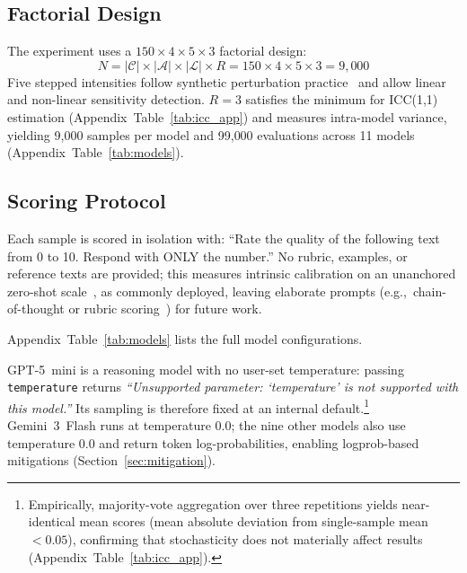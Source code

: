 \documentclass[11pt]{article}
\newcommand{\eg}{e.g.,\ }
\begin{document}
\subsection{Factorial Design}

The experiment uses a $150 \times 4 \times 5 \times 3$ factorial design:
\begin{equation}
    N = |\mathcal{C}| \times |\mathcal{A}| \times |\mathcal{L}| \times
    R = 150 \times 4 \times 5 \times 3 = 9{,}000
    \label{eq:design}
\end{equation}
Five stepped intensities follow synthetic perturbation practice~\citep{ribeiro2020beyond}
and allow linear and non-linear sensitivity detection. $R=3$ satisfies
the minimum for ICC(1,1) estimation (Appendix~Table~\ref{tab:icc_app})
and measures intra-model variance, yielding 9{,}000 samples per model
and 99{,}000 evaluations across 11 models (Appendix~Table~\ref{tab:models}).

\subsection{Scoring Protocol}

Each sample is scored in isolation with: ``Rate the quality of the
following text from 0 to 10. Respond with ONLY the number.'' No rubric,
examples, or reference texts are provided; this measures intrinsic
calibration on an unanchored zero-shot scale~\citep{zheng2023judging},
as commonly deployed, leaving elaborate prompts (\eg chain-of-thought or
rubric scoring~\citep{liu2023geval}) for future work.

Appendix~Table~\ref{tab:models} lists the full model configurations.



GPT-5~mini is a reasoning model with no user-set temperature: passing
\texttt{temperature} returns \textit{``Unsupported parameter: `temperature'
is not supported with this model.''} Its sampling is therefore fixed at
an internal default.\footnote{Empirically, majority-vote aggregation over
three repetitions yields near-identical mean scores (mean absolute
deviation from single-sample mean $<0.05$), confirming that stochasticity
does not materially affect results (Appendix~Table~\ref{tab:icc_app}).}
Gemini~3~Flash runs at temperature 0.0; the nine other models also use
temperature 0.0 and return token log-probabilities, enabling logprob-based
mitigations (Section~\ref{sec:mitigation}).

\end{document}
